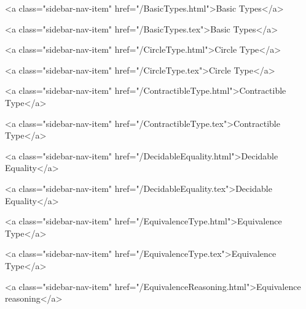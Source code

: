          <a class="sidebar-nav-item" href="/BasicTypes.html">Basic Types</a>
        
      
    
      
        
          <a class="sidebar-nav-item" href="/BasicTypes.tex">Basic Types</a>
        
      
    
      
        
          <a class="sidebar-nav-item" href="/CircleType.html">Circle Type</a>
        
      
    
      
        
          <a class="sidebar-nav-item" href="/CircleType.tex">Circle Type</a>
        
      
    
      
        
          <a class="sidebar-nav-item" href="/ContractibleType.html">Contractible Type</a>
        
      
    
      
        
          <a class="sidebar-nav-item" href="/ContractibleType.tex">Contractible Type</a>
        
      
    
      
        
          <a class="sidebar-nav-item" href="/DecidableEquality.html">Decidable Equality</a>
        
      
    
      
        
          <a class="sidebar-nav-item" href="/DecidableEquality.tex">Decidable Equality</a>
        
      
    
      
        
          <a class="sidebar-nav-item" href="/EquivalenceType.html">Equivalence Type</a>
        
      
    
      
        
          <a class="sidebar-nav-item" href="/EquivalenceType.tex">Equivalence Type</a>
        
      
    
      
        
          <a class="sidebar-nav-item" href="/EquivalenceReasoning.html">Equivalence reasoning</a>
        
      
    
